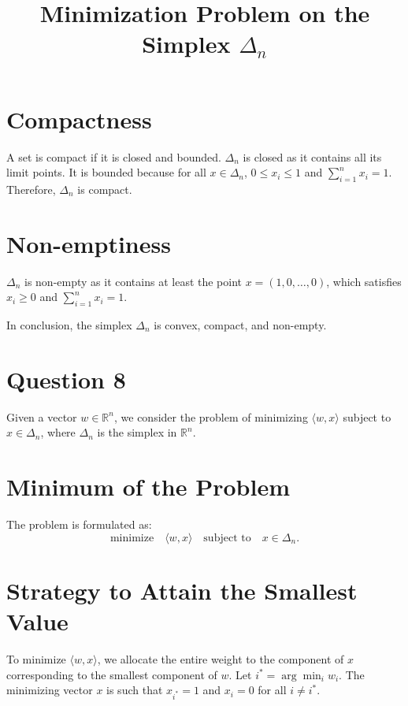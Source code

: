 \documentclass[12p]{article}
\begin{document}
\section*{Compactness}
A set is compact if it is closed and bounded. \(\Delta_n\) is closed as it contains all its limit points. It is bounded because for all \( x \in \Delta_n \), \( 0 \leq x_i \leq 1 \) and \( \sum_{i=1}^n x_i = 1 \). Therefore, \(\Delta_n\) is compact.

\section*{Non-emptiness}
\(\Delta_n\) is non-empty as it contains at least the point \( x = (1, 0, \ldots, 0) \), which satisfies \( x_i \geq 0 \) and \( \sum_{i=1}^n x_i = 1 \).

In conclusion, the simplex \( \Delta_n \) is convex, compact, and non-empty.

\section*{Question 8} 

\title{Minimization Problem on the Simplex \( \Delta_n \)}
\maketitle

Given a vector \( w \in \mathbb{R}^n \), we consider the problem of minimizing \( \langle w, x \rangle \) subject to \( x \in \Delta_n \), where \( \Delta_n \) is the simplex in \( \mathbb{R}^n \).

\section*{Minimum of the Problem}
The problem is formulated as:
\[ \text{minimize} \quad \langle w, x \rangle \quad \text{subject to} \quad x \in \Delta_n. \]

\section*{Strategy to Attain the Smallest Value}
To minimize \( \langle w, x \rangle \), we allocate the entire weight to the component of \( x \) corresponding to the smallest component of \( w \). Let \( i^* = \arg \min_i w_i \). The minimizing vector \( x \) is such that \( x_{i^*} = 1 \) and \( x_i = 0 \) for all \( i \neq i^* \).
\end{document}
